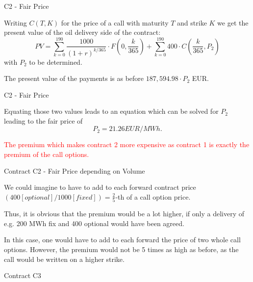 {C2 - Fair Price}






	
Writing $C(T,K)$ for the price of a call with maturity $T$ and strike $K$ we get the present value of the oil delivery side of the contract:
$$
	PV = \sum_{k=0}^{190} \frac{1000}{(1+r)^{k/365}} \cdot F(0,\frac k {365}) + \sum_{k=0}^{190} 400 \cdot C(\frac k {365},P_2)
$$
with $P_2$ to be determined.


	The present value of the payments is as before $187,594.98 \cdot P_2$ EUR.





{C2 - Fair Price}






	
Equating those two values leads to an equation which can be solved for $P_2$ leading to the fair price of
$$
	P_2 = 21.26 EUR/MWh.
$$


	
\textcolor{red}{The premium which makes contract 2 more expensive as contract 1 is exactly the premium of the call options.}





{Contract C2 - Fair Price depending on Volume}






	We could imagine to have to add to each forward contract price $(400 [optional]/1000 [fixed]) = \frac 2 5$-th of a call option price.


	Thus, it is obvious that the premium would be a lot higher, if only a delivery of e.g. 200 MWh fix and 400 optional would have been agreed.


	In this case, one would have to add to each forward the price of two whole call options. However, the premium would not be 5 times as high as before, as the call would be written on a higher strike.






{Contract C3}


